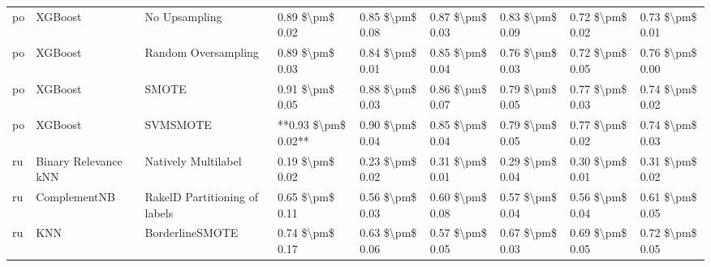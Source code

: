 \begin{tabular}{lllllllll}
      po &                         XGBoost &                 No Upsampling &     0.89 \$\textbackslash pm\$ 0.02 &           0.85 \$\textbackslash pm\$ 0.08 &       0.87 \$\textbackslash pm\$ 0.03 &        0.83 \$\textbackslash pm\$ 0.09 &                         0.72 \$\textbackslash pm\$ 0.02 &     0.73 \$\textbackslash pm\$ 0.01 \\
      po &                         XGBoost &           Random Oversampling &     0.89 \$\textbackslash pm\$ 0.03 &           0.84 \$\textbackslash pm\$ 0.01 &       0.85 \$\textbackslash pm\$ 0.04 &        0.76 \$\textbackslash pm\$ 0.03 &                         0.72 \$\textbackslash pm\$ 0.05 &     0.76 \$\textbackslash pm\$ 0.00 \\
      po &                         XGBoost &                         SMOTE &     0.91 \$\textbackslash pm\$ 0.05 &           0.88 \$\textbackslash pm\$ 0.03 &       0.86 \$\textbackslash pm\$ 0.07 &        0.79 \$\textbackslash pm\$ 0.05 &                         0.77 \$\textbackslash pm\$ 0.03 &     0.74 \$\textbackslash pm\$ 0.02 \\
      po &                         XGBoost &                      SVMSMOTE & **0.93 \$\textbackslash pm\$ 0.02** &           0.90 \$\textbackslash pm\$ 0.04 &       0.85 \$\textbackslash pm\$ 0.04 &        0.79 \$\textbackslash pm\$ 0.05 &                         0.77 \$\textbackslash pm\$ 0.02 &     0.74 \$\textbackslash pm\$ 0.03 \\
      ru &            Binary Relevance kNN &           Natively Multilabel &     0.19 \$\textbackslash pm\$ 0.02 &           0.23 \$\textbackslash pm\$ 0.02 &       0.31 \$\textbackslash pm\$ 0.01 &        0.29 \$\textbackslash pm\$ 0.04 &                         0.30 \$\textbackslash pm\$ 0.01 &     0.31 \$\textbackslash pm\$ 0.02 \\
      ru &                    ComplementNB & RakelD Partitioning of labels &     0.65 \$\textbackslash pm\$ 0.11 &           0.56 \$\textbackslash pm\$ 0.03 &       0.60 \$\textbackslash pm\$ 0.08 &        0.57 \$\textbackslash pm\$ 0.04 &                         0.56 \$\textbackslash pm\$ 0.04 &     0.61 \$\textbackslash pm\$ 0.05 \\
      ru &                             KNN &               BorderlineSMOTE &     0.74 \$\textbackslash pm\$ 0.17 &           0.63 \$\textbackslash pm\$ 0.06 &       0.57 \$\textbackslash pm\$ 0.05 &        0.67 \$\textbackslash pm\$ 0.03 &                         0.69 \$\textbackslash pm\$ 0.05 &     0.72 \$\textbackslash pm\$ 0.05 \\

\end{tabular}
